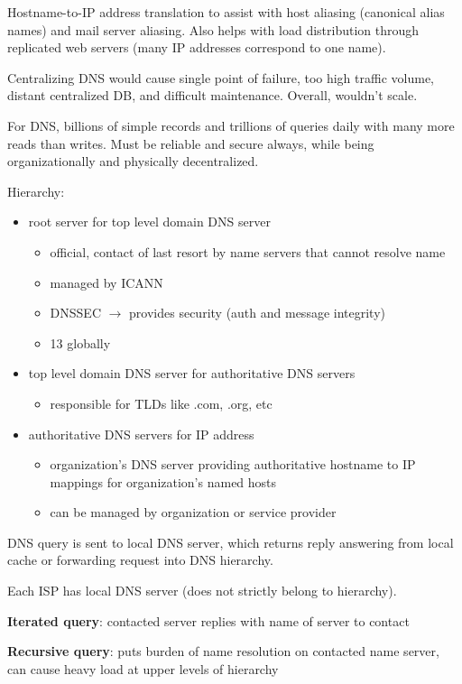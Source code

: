 \documentclass[11pt]{article}
\begin{document}
Hostname-to-IP address translation to assist with host aliasing (canonical alias names) and mail server
aliasing.
Also helps with load distribution through replicated web servers (many IP addresses correspond to
one name).

Centralizing DNS would cause single point of failure, too high traffic volume, distant centralized DB,
and difficult maintenance. Overall, wouldn't scale.

For DNS, billions of simple records and trillions of queries daily with many more reads than writes.
Must be reliable and secure always, while being organizationally and physically decentralized.

Hierarchy:
\begin{itemize}
\item root server for top level domain DNS server
\begin{itemize}
\item official, contact of last resort by name servers that cannot resolve name
\item managed by ICANN
\item DNSSEC \(\to\) provides security (auth and message integrity)
\item 13 globally
\end{itemize}
\item top level domain DNS server for authoritative DNS servers
\begin{itemize}
\item responsible for TLDs like .com, .org, etc
\end{itemize}
\item authoritative DNS servers for IP address
\begin{itemize}
\item organization's DNS server providing authoritative hostname to IP mappings for organization's named
hosts
\item can be managed by organization or service provider
\end{itemize}
\end{itemize}

DNS query is sent to local DNS server, which returns reply answering from local cache or forwarding
request into DNS hierarchy.

Each ISP has local DNS server (does not strictly belong to hierarchy).

\textbf{Iterated query}: contacted server replies with name of server to contact

\textbf{Recursive query}: puts burden of name resolution on contacted name server, can cause heavy load at
upper levels of hierarchy
\end{document}
